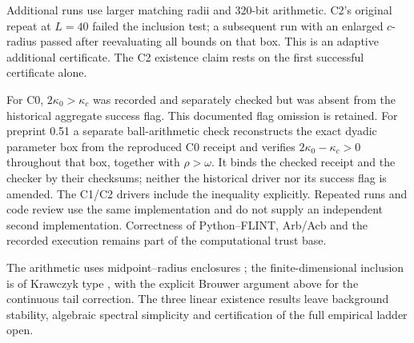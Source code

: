 Additional runs use larger matching radii and 320-bit arithmetic. C2's
original repeat at $L=40$ failed the inclusion test; a subsequent run
with an enlarged $c$-radius passed after reevaluating all bounds on that
box. This is an adaptive additional certificate. The C2 existence claim
rests on the first successful certificate alone.

For C0, $2\kappa_0>\kappa_c$ was recorded and separately checked but
was absent from the historical aggregate success flag. This documented
flag omission is retained. For preprint 0.51 a separate ball-arithmetic
check reconstructs the exact dyadic parameter box from the reproduced
C0 receipt and verifies $2\kappa_0-\kappa_c>0$ throughout that box,
together with $\rho>\omega$. It binds the checked receipt and the checker
by their checksums; neither the historical driver nor its success flag
is amended.
The C1/C2 drivers include the inequality explicitly. Repeated runs and
code review use the same implementation and do not supply an independent
second implementation. Correctness of Python--FLINT, Arb/Acb and the
recorded execution remains part of the computational trust base.

The arithmetic uses midpoint--radius enclosures
\cite{Johansson2017Arb,PythonFlintDocs,FlintSoftware}; the finite-dimensional
inclusion is of Krawczyk type \cite{Krawczyk1969}, with the explicit
Brouwer argument above for the continuous tail correction. The three
linear existence results leave background stability, algebraic spectral
simplicity and certification of the full empirical ladder open.
